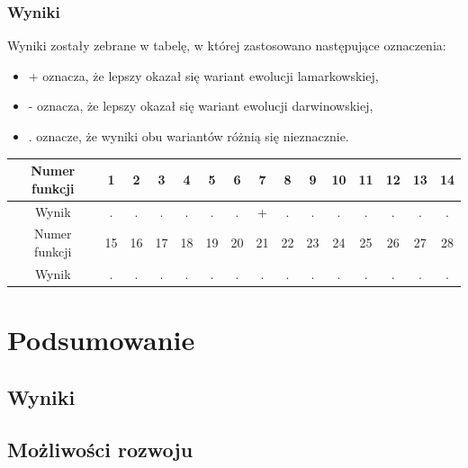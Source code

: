 \documentclass{mini}
\begin{document}
\subsubsection *{Wyniki}
Wyniki zostały zebrane w tabelę, w której zastosowano następujące oznaczenia:
\begin{itemize}[noitemsep]
\item + oznacza, że lepszy okazał się wariant ewolucji lamarkowskiej,
\item - oznacza, że lepszy okazał się wariant ewolucji darwinowskiej,
\item . oznacze, że wyniki obu wariantów różnią się nieznacznie.
\end{itemize}

\begin{tabular}{|c|c|c|c|c|c|c|c|c|c|c|c|c|c|c|} \hline
Numer funkcji & 1 & 2 & 3 & 4 & 5 & 6 & 7 & 8 & 9 & 10 & 11 & 12 & 13 & 14 \\ \hline
Wynik & . & . & . & . & . & . & + & . & . & . & . & . & . & . \\ \hline
Numer funkcji & 15 & 16 & 17 & 18 & 19 & 20 & 21 & 22 & 23 & 24 & 25 & 26 & 27 & 28 \\ \hline
Wynik & . & . & . & . & . & . & . & . & . & . & . & . & . & . \\ \hline
\end{tabular}

\pagebreak

\section{Podsumowanie}

\subsection{Wyniki}

\subsection{Możliwości rozwoju}

\pagebreak
\end{document}
